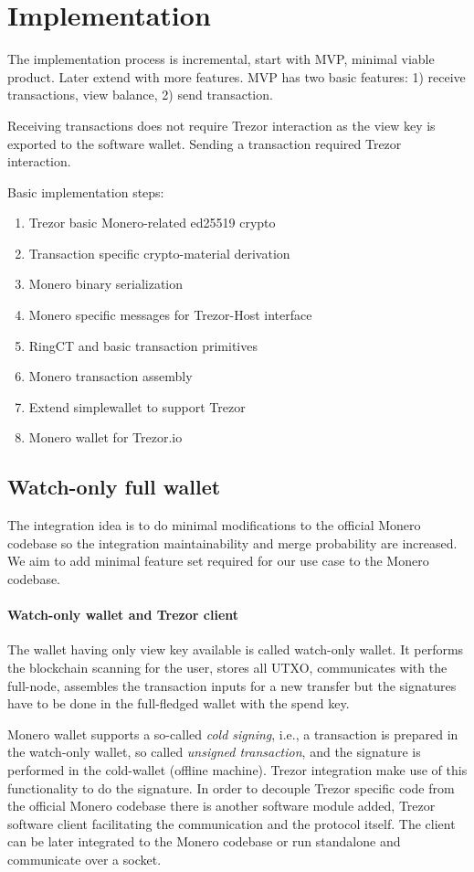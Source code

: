 \documentclass[]{article}
\begin{document}
\section{Implementation}

The implementation process is incremental, start with MVP, minimal viable product. Later extend with more features. MVP has two basic features: 1) receive transactions, view balance, 2) send transaction. 

Receiving transactions does not require Trezor interaction as the view key is exported to the software wallet. Sending a transaction required Trezor interaction.

\;
\noindent Basic implementation steps:
\begin{enumerate}
	\item Trezor basic Monero-related ed25519 crypto
	\item Transaction specific crypto-material derivation
	\item Monero binary serialization
	\item Monero specific messages for Trezor-Host interface
	\item RingCT and basic transaction primitives
	\item Monero transaction assembly
	\item Extend simplewallet to support Trezor
	\item Monero wallet for Trezor.io 
\end{enumerate}

\subsection{Watch-only full wallet}
The integration idea is to do minimal modifications to the official Monero codebase so the integration maintainability and merge probability are increased. We aim to add minimal feature set required for our use case to the Monero codebase. 

\paragraph{Watch-only wallet and Trezor client} 
The wallet having only view key available is called watch-only wallet. It performs the blockchain scanning for the user, stores all UTXO, communicates with the full-node, assembles the transaction inputs for a new transfer but the signatures have to be done in the full-fledged wallet with the spend key. 

Monero wallet supports a so-called \emph{cold signing}, i.e., a transaction is prepared in the watch-only wallet, so called \emph{unsigned transaction}, and the signature is performed in the cold-wallet (offline machine). 
%
Trezor integration make use of this functionality to do the signature. In order to decouple Trezor specific code from the official Monero codebase there is another software module added, Trezor software client facilitating the communication and the protocol itself. The client can be later integrated to the Monero codebase or run standalone and communicate over a socket.
\end{document}
